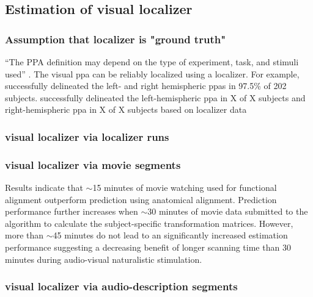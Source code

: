 \subsection{Estimation of visual localizer}



\subsubsection{Assumption that localizer is "ground truth"}

%
``The PPA definition may depend on the type of experiment, task, and stimuli
used'' \citet{weiner2018defining}.
The visual \ac{ppa} can be reliably localized using a localizer.
%
For example, \citet{zhen2017quantifying} successfully delineated the left- and
right hemispheric \acp{ppa} in 97.5\% of 202 subjects.
\citet{sengupta2016extension} successfully delineated the left-hemispheric
\ac{ppa} in X of X subjects and right-hemispheric \ac{ppa} in X of X subjects
based on localizer data


\subsubsection{visual localizer via localizer runs}


\subsubsection{visual localizer via movie segments}

%
Results indicate that $\sim$15 minutes of movie watching used for functional
alignment outperform prediction using anatomical alignment.
%
Prediction performance further increases when $\sim$30 minutes of movie data
submitted to the algorithm to calculate the subject-specific transformation
matrices.
%
However, more than $\sim$45 minutes do not lead to an significantly increased
estimation performance suggesting a decreasing benefit of longer scanning time
than 30 minutes during audio-visual naturalistic stimulation.


\subsubsection{visual localizer via audio-description segments}



